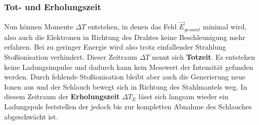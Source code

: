 \subsubsection{Tot- und Erholungszeit}
Nun können Momente $\Delta T$ entstehen, in denen das Feld $\vec{E}_{gesamt}$ minimal wird, also auch die Elektronen in Richtung des Drahtes keine Beschleunigung mehr erfahren. 
Bei zu geringer Energie wird also trotz einfallender Strahlung Stoßionisation verhindert. Dieser Zeitraum $\Delta T$ nennt sich \textbf{Totzeit}. Es entstehen keine Ladungsimpulse und dadurch kann kein Messwert der Intensität gefunden werden.
Durch fehlende Stoßionisation bleibt aber auch die Generierung neue Ionen aus und der Schlauch bewegt sich in Richtung des Stahlmantels weg. 
In diesem Zeitraum der \textbf{Erholungszeit} $\Delta T_E$ lässt sich langsam wieder ein Ladungspuls feststellen der jedoch bis zur kompletten Abnahme des Schlauches abgeschwächt ist.

